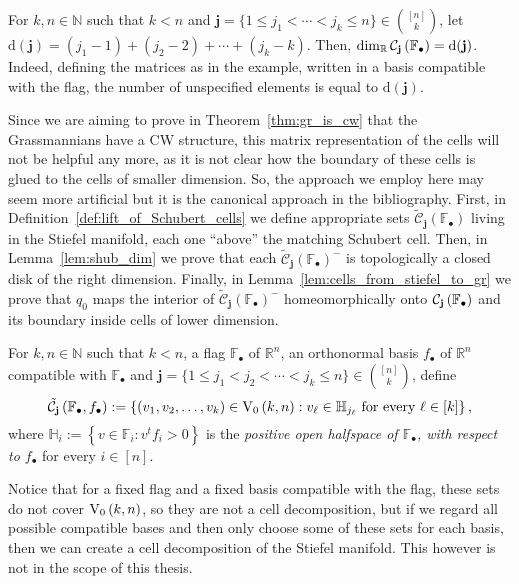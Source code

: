 \begin{remark} For $k,n\in\mathbb{N}$ such that $k<n$ and $\mathbf{j}=\{1\leq j_1<\cdots<j_k\leq n\}\in\binom{[n]}{k}$, let $\mathrm{d}(\mathbf{j})=(j_1-1)+(j_2-2)+\cdots+(j_k-k)$. Then, $\dim_{\mathbb{R}}\mathcal{C}_{\mathbf{j}}\left(\mathbb{F}_{\bullet}\right)=\mathrm{d}(\mathbf{j})$. Indeed, defining the matrices as in the example, written in a basis compatible with the flag, the number of unspecified elements is equal to $\mathrm{d}(\mathbf{j})$.
\end{remark}

Since we are aiming to prove in Theorem~\ref{thm:gr_is_cw} that the Grassmannians have a CW structure, this matrix representation of the cells will not be helpful any more, as it is not clear how the boundary of these cells is glued to the cells of smaller dimension. So, the approach we employ here may seem more artificial but it is the canonical approach in the bibliography. First, in Definition~\ref{def:lift_of_Schubert_cells} we define appropriate sets $\tilde{\mathcal{C}}_{\mathbf{j}}(\mathbb{F}_{\bullet})$ living in the Stiefel manifold, each one ``above'' the matching Schubert cell. Then, in Lemma~\ref{lem:shub_dim} we prove that each $\tilde{\mathcal{C}}_{\mathbf{j}}{\left(\mathbb{F}_{\bullet}\right)}^-$ is topologically a closed disk of the right dimension. Finally, in Lemma~\ref{lem:cells_from_stiefel_to_gr} we prove that $q_0$ maps the interior of $\tilde{\mathcal{C}}_{\mathbf{j}}(\mathbb{F}_{\bullet})^-$ homeomorphically onto $\mathcal{C}_{\mathbf{j}}\left(\mathbb{F}_{\bullet}\right)$ and its boundary inside cells of lower dimension.

\begin{definition}\label{def:lift_of_Schubert_cells} For $k,n\in\mathbb{N}$ such that $k<n$, a flag $\mathbb{F}_{\bullet}$ of $\mathbb{R}^n$, an orthonormal basis $f_{\bullet}$ of $\mathbb{R}^n$ compatible with $\mathbb{F}_{\bullet}$ and $\mathbf{j}=\{1\leq j_1<j_2<\cdots<j_k\leq n\}\in\binom{[n]}{k}$, define
\[\stcell{j}:=\left\{(v_1,v_2,\ldots,v_k)\in\StO{k}{n}:v_{\ell}\in\mathbb{H}_{j_{\ell}}\text{ for every }\ell\in[k]\right\},\]
where $\mathbb{H}_i:=\left\{v\in\mathbb{F}_i:v^tf_i>0\right\}$ is the \emph{positive open halfspace of $\mathbb{F}_{\bullet}$, with respect to $f_{\bullet}$} for every $i\in[n]$.
\end{definition}

Notice that for a fixed flag and a fixed basis compatible with the flag, these sets do not cover $\StO{k}{n}$, so they are not a cell decomposition, but if we regard all possible compatible bases and then only choose some of these sets for each basis, then we can create a cell decomposition of the Stiefel manifold. This however is not in the scope of this thesis.

